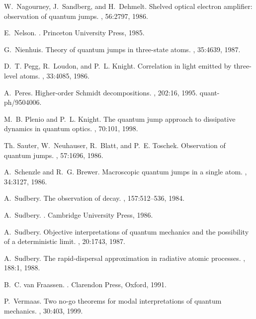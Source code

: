 \documentclass[12pt,a4paper,reqno]{article}
\renewcommand{\(}{\left(}
\renewcommand{\)}{\right)}
\newcommand{\<}{\langle}
\renewcommand{\>}{\rangle}
\theoremstyle{plain} %
\theoremstyle{definition}
\theoremstyle{remark}
\begin{document}
\begin{thebibliography}{10}
W.~Nagourney, J.~Sandberg, and H.~Dehmelt.
\newblock Shelved optical electron amplifier: observation of quantum jumps.
, 56:2797, 1986.

E.~Nelson.
.
\newblock Princeton University Press, 1985.

G.~Nienhuis.
\newblock Theory of quantum jumps in three-state atoms.
, 35:4639, 1987.

D.~T. Pegg, R.~Loudon, and P.~L. Knight.
\newblock Correlation in light emitted by three-level atoms.
, 33:4085, 1986.

A.~Peres.
\newblock Higher-order {S}chmidt decompositions.
, 202:16, 1995.
\newblock quant-ph/9504006.

M.~B. Plenio and P.~L. Knight.
\newblock The quantum jump approach to dissipative dynamics in quantum optics.
, 70:101, 1998.

Th. Sauter, W.~Neuhauser, R.~Blatt, and P.~E. Toschek.
\newblock Observation of quantum jumps.
, 57:1696, 1986.

A.~Schenzle and R.~G. Brewer.
\newblock Macroscopic quantum jumps in a single atom.
, 34:3127, 1986.

A.~Sudbery.
\newblock The observation of decay.
, 157:512--536, 1984.

A.~Sudbery.
.
\newblock Cambridge University Press, 1986.

A.~Sudbery.
\newblock Objective interpretations of quantum mechanics and the possibility of
  a deterministic limit.
, 20:1743, 1987.

A.~Sudbery.
\newblock The rapid-dispersal approximation in radiative atomic processes.
, 188:1, 1988.

B.~C. van Fraassen.
.
\newblock Clarendon Press, Oxford, 1991.

P.~Vermaas.
\newblock Two no-go theorems for modal interpretations of quantum mechanics.
, 30:403, 1999.


\end{thebibliography}
\end{document}
